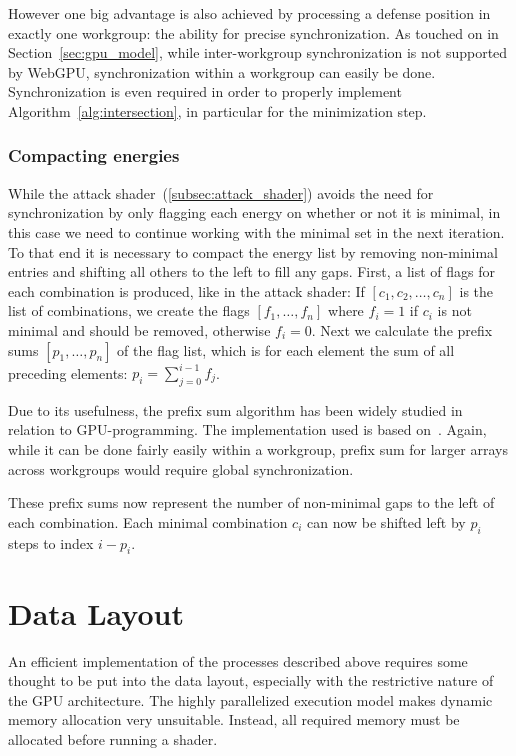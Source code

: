 However one big advantage is also achieved by processing a defense position in
exactly one workgroup:
the ability for precise synchronization.
As touched on in Section~\ref{sec:gpu_model},
while inter-workgroup synchronization is not supported by \mbox{WebGPU},
synchronization within a workgroup can easily be done.
Synchronization is even required in order to properly implement
Algorithm~\ref{alg:intersection}, in particular for the minimization step.

\subsubsection{Compacting energies}

While the attack shader~(\ref{subsec:attack_shader}) avoids the need for
synchronization by only flagging each energy on whether or not it is minimal,
in this case we need to continue working with the minimal set in the next
iteration.
To that end it is necessary to compact the energy list by removing non-minimal
entries and shifting all others to the left to fill any gaps.
First, a list of flags for each combination is produced, like in the attack
shader:
If $[c_1, c_2, \ldots, c_n]$ is the list of combinations,
we create the flags $[f_1, \ldots, f_n]$ where $f_i = 1$ if $c_i$ is not minimal
and should be removed, otherwise $f_i = 0$.
Next we calculate the prefix sums $[p_1, \ldots, p_n]$ of the flag list,
which is for each element the sum of all preceding elements:
$p_i = \sum_{j = 0}^{i - 1} f_j$.

Due to its usefulness, the prefix sum algorithm has been widely studied in
relation to GPU-programming.
The implementation used is based on~\cite{Harris2011ParallelPS}.
Again, while it can be done fairly easily within a workgroup,
prefix sum for larger arrays across workgroups would require global
synchronization.

These prefix sums now represent the number of non-minimal gaps to the left of
each combination.
Each minimal combination $c_i$ can now be shifted left by $p_i$ steps to index
$i - p_i$.


\section{Data Layout}

An efficient implementation of the processes described above requires some
thought to be put into the data layout,
especially with the restrictive nature of the GPU architecture.
The highly parallelized execution model makes dynamic memory allocation very
unsuitable.
Instead, all required memory must be allocated before running a shader.

